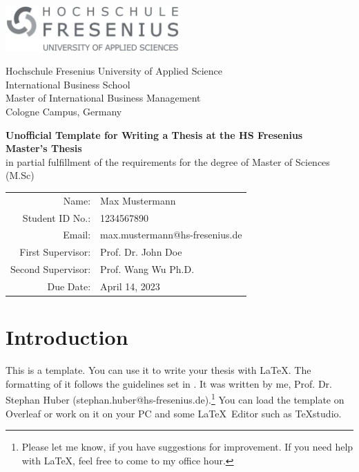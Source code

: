\documentclass[12pt,final,a4paper,oneside]{book}
\begin{document}
\thispagestyle{empty}
	
\begin{titlepage}
	\hfill\includegraphics[width=0.5\textwidth]{hslogo.pdf}\vspace*{1em}
	\begin{center}
		Hochschule Fresenius University of Applied Science\\
		International Business School\\
		Master of International Business Management\\
		Cologne Campus, Germany\\\vfill
		
		{\LARGE\textbf{Unofficial Template for Writing a Thesis at the HS Fresenius}}\\\vspace*{\fill}
		\textbf{Master's Thesis}\\
		in partial fulfillment of the requirements for the degree of Master of Sciences (M.Sc) \vspace*{\fill}
			
	\begin{tabular}{rl}
		Name: & Max Mustermann\\
		Student ID No.: & 1234567890\\
		Email: & max.mustermann@hs-fresenius.de\\
		First Supervisor: & Prof. Dr. John Doe\\
		Second Supervisor: & Prof. Wang Wu Ph.D.\\
		Due Date: & April 14, 2023\\
	\end{tabular}
	\end{center}
\end{titlepage}
\addtocounter{page}{1}

\tableofcontents
\listoffigures
\listoftables
	

\chapter{Introduction}\label{sec:intro}

This is a template. You can use it to write your thesis with \LaTeX. The formatting of it follows the guidelines set in \cite{Hildebrandt2019}. It was written by me, Prof. Dr. Stephan Huber (stephan.huber@hs-fresenius.de).\footnote{Please let me know, if you have suggestions for improvement. If you need help with \LaTeX, feel free to come to my office hour.} You can load the template on Overleaf or work on it on your PC and some \LaTeX\ Editor such as TeXstudio. 
	
\end{document}
